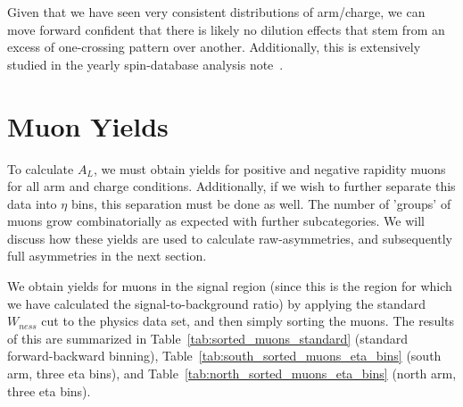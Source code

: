 Given that we have seen very consistent distributions of arm/charge, we can move
forward confident that there is likely no dilution effects that stem from an
excess of one-crossing pattern over another. Additionally, this is extensively
studied in the yearly spin-database analysis note~\cite{Kim2014}.

\clearpage
\section{Muon Yields}

To calculate $A_L$, we must obtain yields for positive and negative rapidity
muons for all arm and charge conditions. Additionally, if we wish to further
separate this data into $\eta$ bins, this separation must be done as well. The
number of 'groups' of muons grow combinatorially as expected with further
subcategories. We will discuss how these yields are used to calculate
raw-asymmetries, and subsequently full asymmetries in the next section.

We obtain yields for muons in the signal region (since this is the region for
which we have calculated the signal-to-background ratio) by applying the
standard $W_{ness}$ cut to the physics data set, and then simply sorting the
muons. The results of this are summarized in
Table~\ref{tab:sorted_muons_standard} (standard forward-backward binning),
Table~\ref{tab:south_sorted_muons_eta_bins} (south arm, three eta bins), and
Table~\ref{tab:north_sorted_muons_eta_bins} (north arm, three eta bins).

